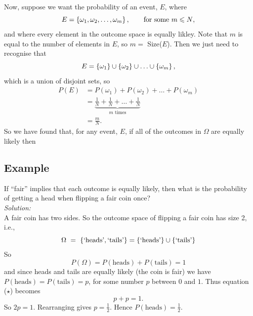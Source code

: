 \noindent Now, suppose we want the probability of an event, $E$, where
\[
E = \left\{\omega_1,\omega_2,\ldots,\omega_m\right\}, \qquad \text{for some $m \leqslant N$},
\]
and where every element in the outcome space is equally likley. Note that $m$ is equal to the number of elements in $E$, so $m = $ Size($E$). Then we just need to recognise that
\[
E = \left\{\omega_1\right\} \cup \left\{\omega_2\right\} \cup \ldots \cup \left\{\omega_m\right\},
\]
which is a union of disjoint sets, so
\begin{align*}
P(E)  & = P(\omega_1) + P(\omega_2) + \ldots + P(\omega_m) \tag{by probability measure axiom 3} \\
	& = \underbrace{\frac{1}{N} + \frac{1}{N} + \ldots + \frac{1}{N}}_{m \text{ times}} \tag{by the result in the box above} \\
	& = \frac{m}{N}.
\end{align*}
 So we have found that, for any event, $E$, if all of the outcomes in $\Omega$ are equally likely then

  	\bigskip
	
	\hfil{}
	\bigskip
	
 
 
\subsection{Example} 
If ``fair'' implies that each outcome is equally likely, then what is the probability of getting a head when flipping a fair coin once? \\

\noindent \textit{Solution:} \\
A fair coin has two sides. So the outcome space of flipping a fair coin has size 2, i.e., 
\[
\Omega~=~\left\{\text{`heads'},\text{`tails'}\right\} = \left\{\text{`heads'}\right\} \cup \left\{\text{`tails'}\right\}
\]
So 
\[
P(\Omega) = P(\text{heads}) + P(\text{tails}) = 1 \tag{($\star$)}
\] 
and since heads and tails are equally likely (the coin is fair) we have $P(\text{heads}) = P(\text{tails}) = p$, for some number $p$ between $0$ and $1$. Thus equation ($\star$) becomes
\[
p + p = 1.
\]
So $2p = 1$. Rearranging gives $p = \frac{1}{2}$. Hence $P(\text{heads}) = \frac{1}{2}$.

